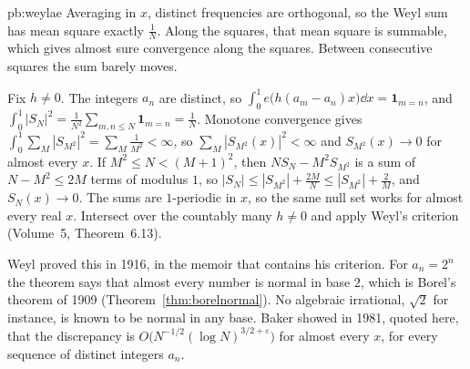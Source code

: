 \begin{solution}{pb:weylae}
\idea Averaging in $x$, distinct frequencies are orthogonal, so the Weyl sum has mean square exactly $\frac1N$. Along the squares, that mean square is summable, which gives almost sure convergence along the squares. Between consecutive squares the sum barely moves.

\writeup Fix $h\ne 0$. The integers $a_n$ are distinct, so $\int_0^1 e\bigl(h(a_m-a_n)x\bigr)\dd x=\mathbf 1_{m=n}$, and $\int_0^1|S_N|^2=\frac1{N^2}\sum_{m,n\le N}\mathbf 1_{m=n}=\frac1N$. Monotone convergence gives $\int_0^1\sum_M|S_{M^2}|^2=\sum_M\frac1{M^2}<\infty$, so $\sum_M|S_{M^2}(x)|^2<\infty$ and $S_{M^2}(x)\to 0$ for almost every $x$. If $M^2\le N<(M+1)^2$, then $NS_N-M^2 S_{M^2}$ is a sum of $N-M^2\le 2M$ terms of modulus $1$, so $|S_N|\le|S_{M^2}|+\frac{2M}N\le|S_{M^2}|+\frac2M$, and $S_N(x)\to 0$. The sums are $1$-periodic in $x$, so the same null set works for almost every real $x$. Intersect over the countably many $h\ne 0$ and apply Weyl's criterion (Volume~5, Theorem~6.13).

\leads Weyl proved this in 1916, in the memoir that contains his criterion. For $a_n=2^n$ the theorem says that almost every number is normal in base $2$, which is Borel's theorem of 1909 (Theorem~\ref{thm:borelnormal}). No algebraic irrational, $\sqrt2$ for instance, is known to be normal in any base. Baker showed in 1981, quoted here, that the discrepancy is $O\bigl(N^{-1/2}(\log N)^{3/2+\varepsilon}\bigr)$ for almost every $x$, for every sequence of distinct integers $a_n$.
\end{solution}

